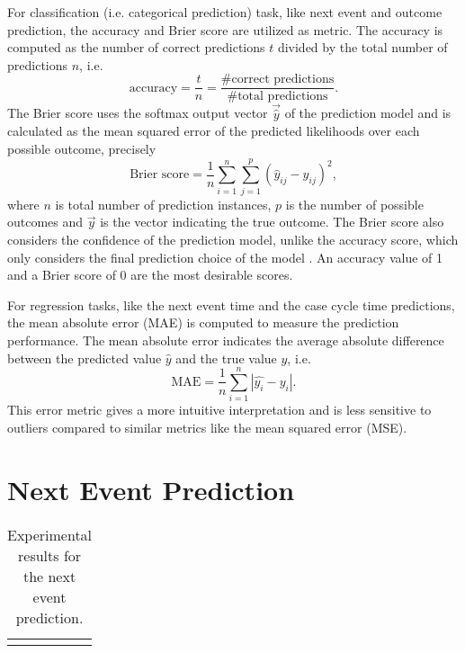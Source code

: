 For classification (i.e. categorical prediction) task, like next event and outcome prediction, the accuracy and Brier score \cite{Brier1950VERIFICATIONOF} are utilized as metric.
The accuracy is computed as the number of correct predictions $t$ divided by the total number of predictions $n$, i.e. 
\begin{equation*}
	\textrm{accuracy} = \dfrac{t}{n} = \dfrac{\textrm{\# correct predictions}}{\textrm{\# total predictions}}.
\end{equation*}
The Brier score uses the softmax output vector  $\vec{\hat{y}}$ of the prediction model and is calculated as the mean squared error of the predicted likelihoods over each possible outcome, precisely
\begin{equation*}
	\textrm{Brier score} = \dfrac{1}{n} \sum_{i=1}^{n}\sum_{j=1}^{p}(\hat{y}_{ij}-y_{ij})^2,
\end{equation*}
where $n$ is total number of prediction instances, $p$ is the number of possible outcomes and $\vec{y}$ is the vector indicating the true outcome.
The Brier score also considers the confidence of the prediction model, unlike the accuracy score, which only considers the final prediction choice of the model .
An accuracy value of 1 and a Brier score of 0 are the most desirable scores.

For regression tasks, like the next event time and the case cycle time predictions, the mean absolute error (MAE) is computed to measure the prediction performance. The mean absolute error indicates the average absolute difference between the predicted value $\hat{y}$ and the true value $y$,  i.e.
\begin{equation*}
	\textrm{MAE} = \dfrac{1}{n}\sum_{i=1}^{n}|\hat{y_i} - y_i|.
\end{equation*}
This error metric gives a more intuitive interpretation and is less sensitive to outliers compared to similar metrics like the mean squared error (MSE).

\section{Next Event Prediction}

\begin{table}[!htbp]
	\begin{tabularx}{\textwidth}{l l l l }
		\toprule
		& & &  \\
		\midrule
		& & & \\
		\bottomrule
	\end{tabularx}
	\caption[Experimental results for the next event prediction]{Experimental results for the next event prediction.}
	\label{tab:next-event}
\end{table}

